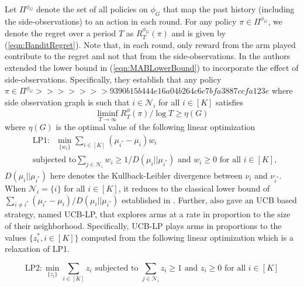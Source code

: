 \documentclass{article}
\begin{document}
Let $\Pi^{\phi_G}$ denote the set of all policies on $\phi_G$ that map the past history (including the side-observations) to an action in each round. For any policy $\pi  \in \Pi^{\phi_G}$, we denote the regret over a period $T$ as $R^{\phi_G}_T(\pi)$ and is given by (\ref{eqn:BanditRegret}). Note that, in each round, 
only reward from the arm played contribute to the regret and not that from the side-observations. In \cite{Sigmetrics15_StochasticBanditsWithSideObservations_BuccapatnamEriyilmazShroff} the authors extended the lower bound in (\ref{eqn:MABLowerBound}) to incorporate the effect of side-observations. Specifically, they establish that any policy $\pi \in \Pi^{\phi_G} 
>>>>>>> 9390b15b444e16a04b264c6c7bfa3887ccfa123e
$ where side observation graph is such that $i \in \mathcal{N}_i$ for all $i\in [K]$ satisfies
\begin{equation}
	\liminf_{T \rightarrow \infty} R^{\phi}_T(\pi)/\log T \geq \eta(G)
	\end{equation}
		where $\eta(G)$ is the optimal value of the following linear optimization
	\begin{align}
	& \mbox{LP1}:\; \;\displaystyle\min_{\{w_i\}}\sum_{i \in [K]}(\mu_{i^*}- \mu_i) w_i \nonumber\\
	\label{eqn:LowerBoundLP}
	& \mbox{subjected to} \sum_{j \in \mathcal{N}_i}w_i\geq 1/D(\mu_i || \mu_{i^*}) \mbox{ and } w_i \geq 0 \mbox{  for all } i\in [K],
	\end{align}
$D(\mu_i || \mu_{i^*})$ here denotes the Kullback-Leibler divergence between $\nu_i$ and $\nu_{i^*}$. 
When $\mathcal{N}_i=\{i\}$ for all $i\in [K]$, it reduces to the classical lower bound of $\sum_{i\neq i^*}(\mu_{i^*}- \mu_i)/D(\mu_i || \mu_{i^*})$ established in \cite{AAM85_Asymptotically_LaiRobbins}. Further, \cite{Sigmetrics15_StochasticBanditsWithSideObservations_BuccapatnamEriyilmazShroff} also gave an UCB based strategy, named UCB-LP, that explores arms at a rate in proportion to the size of their neighborhood. Specifically, UCB-LP plays arms in proportions to the values $\{z_i^*, i\in [K]\}$ computed from the following linear optimization which is a relaxation of LP1. 

	\begin{equation}
	\label{eqn:LowerRelaxedBoundLP}
	\mbox{LP2}: \displaystyle\min_{\{z_i\}}\sum_{i \in [K]} z_i 
	 \mbox{ subjected to } \sum_{j \in \mathcal{N}_i}z_i\geq 1 \mbox{ and } z_i \geq 0 \mbox{  for all } i\in [K]
	\end{equation}
\end{document}
